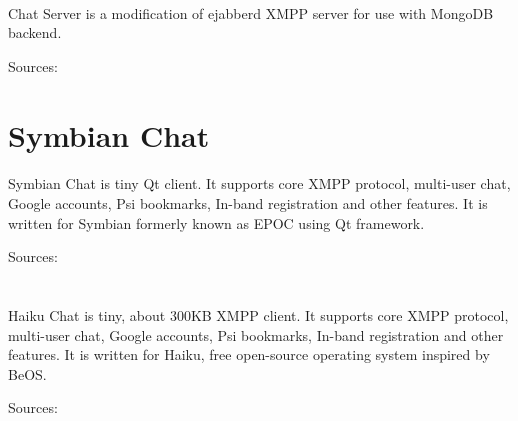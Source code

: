 \documentclass[11pt]{article}
\begin{document}
\paragraph{}
Chat Server is a modification of ejabberd XMPP server for use with MongoDB backend.

Sources: 



\section*{Symbian Chat}
\paragraph{}
Symbian Chat is tiny Qt client. It supports core XMPP protocol,
multi-user chat, Google accounts, Psi bookmarks, In-band registration
and other features. It is written for Symbian formerly known as EPOC using Qt framework.

Sources: 


\section*{}
\paragraph{}
Haiku Chat is tiny, about 300KB XMPP client.
It supports core XMPP protocol, multi-user chat, Google accounts,
Psi bookmarks, In-band registration and other features.
It is written for Haiku, free open-source operating system inspired by BeOS.

Sources: 


\section*{}
\end{document}
